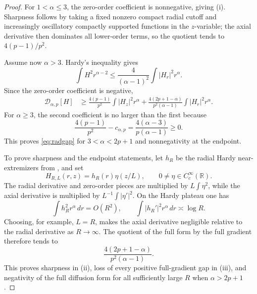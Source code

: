 \documentclass[10pt,a4paper]{amsart}
\newcommand{\R}{\mathbb R}
\begin{document}
\begin{proof}
For \(1<\alpha\le3\), the zero-order coefficient is nonnegative, giving (i).  Sharpness follows by taking a fixed nonzero compact radial cutoff and increasingly oscillatory compactly supported functions in the \(z\)-variable; the axial derivative then dominates all lower-order terms, so the quotient tends to \(4(p-1)/p^2\).

Assume now \(\alpha>3\).  Hardy's inequality gives
\[
 \int H^2r^{\alpha-2}\le\frac4{(\alpha-1)^2}
 \int|H_r|^2r^\alpha.
\]
Since the zero-order coefficient is negative,
\begin{align*}
 \mathcal D_{\alpha,p}[H]
 &\ge
 \frac{4(p-1)}{p^2}\int|H_z|^2r^\alpha
 +\frac{4(2p+1-\alpha)}{p^2(\alpha-1)}
  \int|H_r|^2r^\alpha.
\end{align*}
For \(\alpha\ge3\), the second coefficient is no larger than the first because
\[
 \frac{4(p-1)}{p^2}-c_{\alpha,p}
 =\frac{4(\alpha-3)}{p(\alpha-1)}\ge0.
\]
This proves \eqref{eq:radgap} for \(3<\alpha<2p+1\) and nonnegativity at the endpoint.

To prove sharpness and the endpoint statements, let \(h_R\) be the radial Hardy near-extremizers from , and set
\[
 H_{R,L}(r,z)=h_R(r)\eta(z/L),
 \qquad 0\ne\eta\in C_c^\infty(\R).
\]
The radial derivative and zero-order pieces are multiplied by \(L\int\eta^2\), while the axial derivative is multiplied by \(L^{-1}\int|\eta'|^2\).  On the Hardy plateau one has
\[
 \int h_R^2r^\alpha\,dr=O(R^2),
 \qquad
 \int |h_R'|^2r^\alpha\,dr\asymp\log R.
\]
Choosing, for example, \(L=R\), makes the axial derivative negligible relative to the radial derivative as \(R\to\infty\).  The quotient of the full form by the full gradient therefore tends to
\[
 \frac{4(2p+1-\alpha)}{p^2(\alpha-1)}.
\]
This proves sharpness in (ii), loss of every positive full-gradient gap in (iii), and negativity of the full diffusion form for all sufficiently large \(R\) when \(\alpha>2p+1\).
\end{proof}
\end{document}
